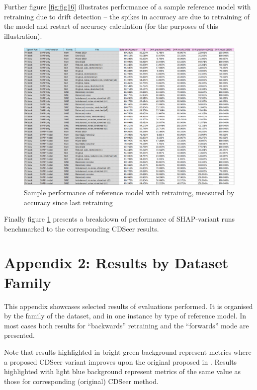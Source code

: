 \documentclass{svproc}
\begin{document}
 Further figure \ref{fig:fig16} illustrates performance of a sample reference model with retraining due to drift detection – the spikes in accuracy are due to retraining of the model and restart of accuracy calculation (for the purposes of this illustration).
 

 
 \begin{figure}
 	\includegraphics[scale=.95]{figures/Fig17_SHAP results.png}
 	\caption{Sample performance of reference model with retraining, measured by accuracy since last retraining}
 	\label{fig:fig17}
 \end{figure}
  
 
 Finally figure \ref{fig:fig17} presents a breakdown of performance of SHAP-variant runs benchmarked to the corresponding CDSeer results.
 
 
 
 
 \section{Appendix 2: Results by Dataset Family}
 \label{sec:secApp2}
 This appendix showcases selected results of evaluations performed. It is organised by the family of the dataset, and in one instance by type of reference model. In most cases both results for “backwards” retraining and the “forwards” mode are presented.
 
 Note that results highlighted in bright green background represent metrics where a proposed CDSeer variant improves upon the original proposed in \cite{pham2025}. Results highlighted with light blue background represent metrics of the same value as those for corresponding (original) CDSeer method.
 
\end{document}
